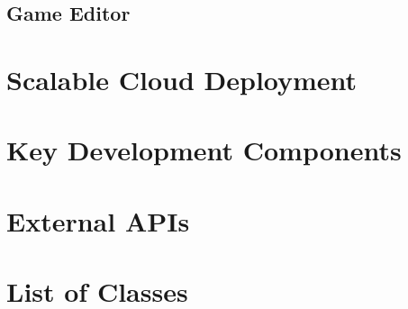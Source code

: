 	\subsection{Game Editor}
	\label{subsection:gameeditor}
\section{Scalable Cloud Deployment}

\section{Key Development Components}

\section{External APIs}

\section{List of Classes}
